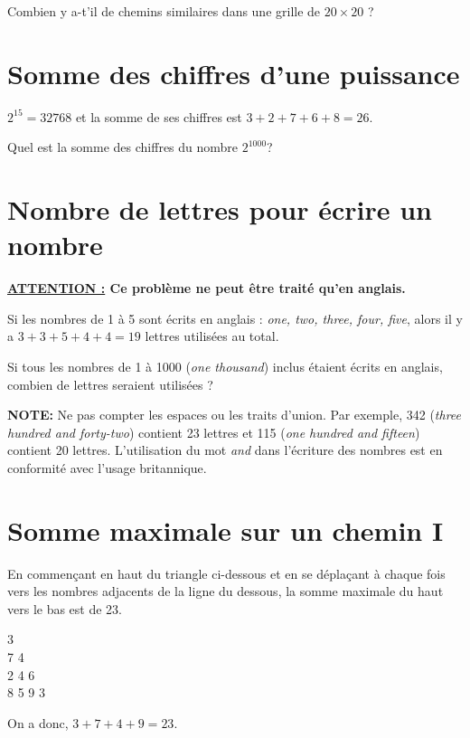 Combien y a-t'il de chemins similaires dans une grille de $20\times20$ ?


\section{Somme des chiffres d'une puissance} \label{pb.016}
$2^{15} = 32768$ et la somme de ses chiffres est $3 + 2 + 7 + 6 + 8 = 26$.

Quel est la somme des chiffres du nombre $2^{1000}$?


\section{Nombre de lettres pour écrire un nombre} \label{pb.017}

\textbf{\underline{ATTENTION :} Ce problème ne peut être traité qu'en anglais.}
\medskip

Si les nombres de 1 à 5 sont écrits en anglais : \textit{one, two, three, four, five}, alors il y a $3 + 3 + 5 + 4 + 4 = 19$ lettres utilisées au total.

Si tous les nombres de 1 à 1000 (\textit{one thousand}) inclus étaient écrits en anglais, combien de lettres seraient utilisées ?

\textbf{NOTE:} Ne pas compter les espaces ou les traits d'union. Par exemple, 342 (\textit{three hundred and forty-two}) contient 23 lettres et 115 (\textit{one hundred and fifteen}) contient 20 lettres.
L'utilisation du mot \textit{and} dans l'écriture des nombres est en conformité avec l'usage britannique.

\newpage


\section{Somme maximale sur un chemin I} \label{pb.018}
En commençant en haut du triangle ci-dessous et en se déplaçant à chaque fois vers les nombres adjacents de la ligne du dessous, la somme maximale du haut vers le bas est de 23.

\begin{center}
    \textcolor[rgb]{1,0,0}{3}\\\textcolor[rgb]{1,0,0}{7} 4\\2 \textcolor[rgb]{1,0,0}{4} 6\\8 5 \textcolor[rgb]{1,0,0}{9} 3\\
\end{center}

On a donc, $3 + 7 + 4 + 9 = 23$.

